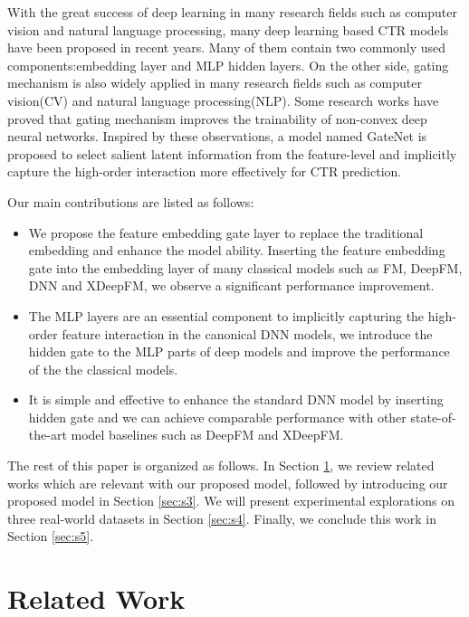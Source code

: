 \documentclass[sigconf,nonacm=true]{acmart}
\begin{document}
With the great success of deep learning in many research fields such as
computer vision\cite{krizhevsky2012imagenet} and natural language processing\cite{mikolov2010recurrent,cho2014learning}, many
deep learning based CTR models have been proposed in recent
years\cite{zhang2016deep,cheng2016wide,guo2017deepfm,lian2018xdeepfm,zhang2019fat}. Many of them contain two commonly used components:embedding layer and MLP hidden layers. On the other side, gating mechanism is also widely applied in many research fields such as computer vision(CV) and natural language processing(NLP). Some research works have proved that  gating  mechanism  improves  the  trainability of non-convex deep neural networks. Inspired by these observations, a model named GateNet is proposed to select salient latent information from the feature-level and implicitly capture the high-order interaction more effectively for CTR prediction. 

Our main contributions are listed as follows:
\begin{itemize}
\item We propose the feature embedding gate layer to replace the traditional embedding and enhance the model ability. 
Inserting the feature embedding gate into the embedding layer of many classical models such as FM, DeepFM, DNN and XDeepFM, 
we observe a significant performance improvement.
\item The MLP layers are an essential component to implicitly capturing the high-order feature interaction in the canonical DNN models, 
we introduce the hidden gate to the MLP parts of deep models and improve the performance of the the classical models.
\item It is simple and effective to enhance the standard DNN model by inserting hidden gate
and we can achieve comparable performance with other state-of-the-art model baselines such as DeepFM and XDeepFM.
\end{itemize}

The rest of this paper is organized as follows. In Section \ref{sec:s2}, we review
related works which are relevant with our proposed model, followed by
introducing our proposed model in Section \ref{sec:s3}. We will present
experimental explorations on three real-world datasets in Section \ref{sec:s4}. Finally, we conclude this work in Section \ref{sec:s5}.

\section{Related Work}
\label{sec:s2}
\end{document}
